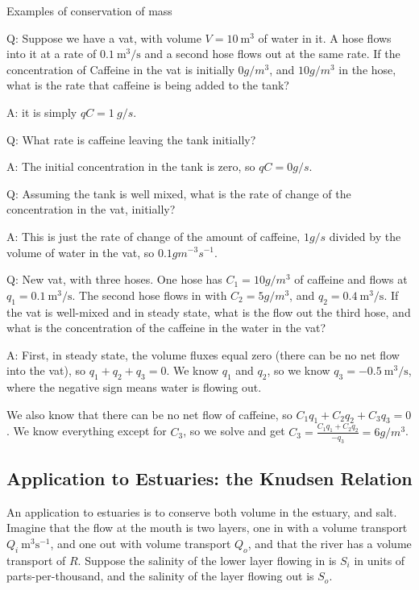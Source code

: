 \begin{derivbox}[label={box:examplemass}]{Examples of conservation of mass}

Q: Suppose we have a vat, with volume $V=10\ \mathrm{m^3}$ of water in it.  A hose flows into it at a rate of $0.1\ \mathrm{m^3/s}$ and a second hose flows out at the same rate.  If the concentration of Caffeine in the vat is initially $0 g/m^3$, and $10 g/m^3$ in the hose, what is the rate that caffeine is being added to the tank?

A: it is simply $qC=1 \ g/s$.

Q: What rate is caffeine  leaving the tank initially?

A: The initial concentration in the tank is zero, so $qC=0 g/s$.

Q: Assuming the tank is well mixed, what is the rate of change of the concentration in the vat, initially?

A: This is just the rate of change of the amount of caffeine, $1 g/s$ divided by the volume of water in the vat, so $0.1 g m^{-3} s^{-1}$.

Q: New vat, with three hoses.  One hose has $C_1=10 g/m^3$ of caffeine and flows at $q_1=0.1\ \mathrm{m^3/s}$. The second hose flows in with $C_2=5 g/m^3$, and $q_2=0.4\ \mathrm{m^3/s}$.  If the vat is well-mixed and in steady state, what is the flow out the third hose, and what is the concentration of the caffeine in the water in the vat?

A: First, in steady state, the volume fluxes equal zero (there can be no net flow into the vat), so $q_1+q_2+q_3=0$.  We know $q_1$ and $q_2$, so we know $q_3=-0.5\ \mathrm{m^3/s}$, where the negative sign means water is flowing out.

We also know that there can be no net flow of caffeine, so $C_1q_1+C_2q_2+C_3q_3=0$.  We know everything except for $C_3$, so we solve and get $C_3= \frac{C_1q_1+C_2q_2}{-q_3}= 6 g/m^3$.

\end{derivbox}

\subsection{Application to Estuaries: the Knudsen Relation}

An application to estuaries is to conserve both volume in the estuary,
and salt.  Imagine that the flow at the mouth is two layers, one in with a
volume transport $Q_i \ \mathrm{m^3 s^{-1}}$, and one out with volume transport $Q_o$, and
that the river has a volume transport of $R$.  Suppose the salinity of
the lower layer flowing in is $S_i$ in units of parts-per-thousand,
and the salinity of the layer flowing out is $S_o$.

